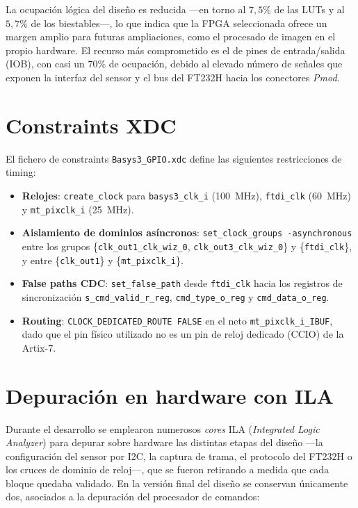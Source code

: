 \documentclass[../main.tex]{subfiles}
\begin{document}
La ocupación lógica del diseño es reducida —en torno al $7{,}5\%$ de las \ac{LUT}s y al $5{,}7\%$ de los biestables—, lo que indica que la \ac{FPGA} seleccionada ofrece un margen amplio para futuras ampliaciones, como el procesado de imagen en el propio hardware. El recurso más comprometido es el de pines de entrada/salida (\ac{IOB}), con casi un $70\%$ de ocupación, debido al elevado número de señales que exponen la interfaz del sensor y el bus del FT232H hacia los conectores \textit{Pmod}.

\section{Constraints XDC}

El fichero de constraints \texttt{Basys3\_GPIO.xdc} define las siguientes restricciones de timing:

\begin{itemize}
    \item \textbf{Relojes}: \texttt{create\_clock} para \texttt{basys3\_clk\_i} (100~MHz), \texttt{ftdi\_clk} (60~MHz) y \texttt{mt\_pixclk\_i} (25~MHz).
    \item \textbf{Aislamiento de dominios asíncronos}: \texttt{set\_clock\_groups -asynchronous} entre los grupos \{\texttt{clk\_out1\_clk\_wiz\_0}, \texttt{clk\_out3\_clk\_wiz\_0}\} y \{\texttt{ftdi\_clk}\}, y entre \{\texttt{clk\_out1}\} y \{\texttt{mt\_pixclk\_i}\}.
    \item \textbf{False paths CDC}: \texttt{set\_false\_path} desde \texttt{ftdi\_clk} hacia los registros de sincronización \texttt{s\_cmd\_valid\_r\_reg}, \texttt{cmd\_type\_o\_reg} y \texttt{cmd\_data\_o\_reg}.
    \item \textbf{Routing}: \texttt{CLOCK\_DEDICATED\_ROUTE FALSE} en el neto \texttt{mt\_pixclk\_i\_IBUF}, dado que el pin físico utilizado no es un pin de reloj dedicado (CCIO) de la Artix-7.
\end{itemize}

\section{Depuración en hardware con ILA}
Durante el desarrollo se emplearon numerosos \textit{cores} ILA (\textit{Integrated Logic Analyzer}) para depurar sobre hardware las distintas etapas del diseño —la configuración del sensor por I2C, la captura de trama, el protocolo del FT232H o los cruces de dominio de reloj—, que se fueron retirando a medida que cada bloque quedaba validado. En la versión final del diseño se conservan únicamente dos, asociados a la depuración del procesador de comandos:
\end{document}

